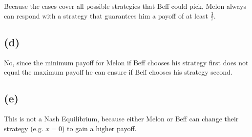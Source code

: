 \documentclass{6046}
\begin{document}
Because the cases cover all possible strategies that Beff could pick,
Melon always can respond with a strategy that guarantees him a 
payoff of at least $\frac{3}{7}$.

\subsection*{(d)}
No, since the minimum payoff for Melon if Beff chooses his strategy first
does not equal the maximum payoff he can ensure if Beff chooses his
strategy second.

\subsection*{(e)}
This is not a Nash Equilibrium, because either Melon or Beff can change
their strategy (e.g. $x = 0$) to gain a higher payoff.
\end{document}
